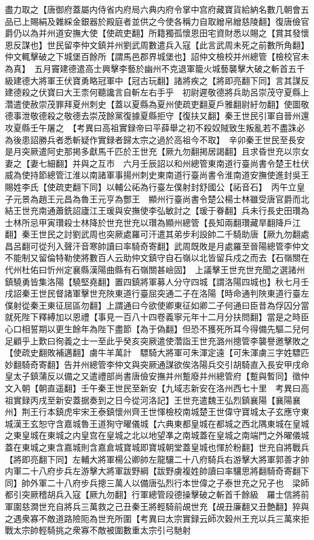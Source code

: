 盡力取之【唐御府蓋屬内侍省内府局六典内府令掌中宫府藏寶貨給納名數几朝會五品已上賜絹及雜綵金銀器於殿庭者並供之今使各稱力自取繒帛繒慈陵翻】復唐儉官爵仍以為并州道安撫大使【使疏吏翻】所籍獨孤懷恩田宅資財悉以賜之【賞其發懷恩反謀也】世民留李仲文鎮并州劉武周數遣兵入寇【此言武周未死之前數所角翻】仲文輒擊破之下城堡百餘所【謂馬邑郡界城堡也】詔仲文檢校并州總管【檢校官未為真】　五月竇建德遣高士興擊李藝於幽州不克退軍籠火城藝襲擊大破之斬首五千級建德大將軍王伏寶勇略冠軍中【冠古玩翻】諸將疾之【將即亮翻下同】言其謀反建德殺之伏寶曰大王柰何聽讒言自斬左右手乎　初尉遲敬德將兵助呂崇茂守夏縣上濳遣使赦崇茂罪拜夏州刺史【蓋以夏縣為夏州使疏吏翻夏戶雅翻尉紆勿翻】使圖敬德事泄敬德殺之敬德去崇茂餘黨復據夏縣拒守【復扶又翻】秦王世民引軍自晉州還攻夏縣壬午屠之　【考異曰高祖實録帝曰平薛舉之初不殺奴賊致生叛亂若不盡誅必為後患詔勝兵者悉斬疑作實録者歸太宗之過於高祖今不取】　辛卯秦王世民至長安　是月突厥遣阿史那掲多獻馬千匹於王世充【厥九勿翻掲居謁翻】且求昏世充以宗女妻之【妻七細翻】并與之互市　六月壬辰詔以和州總管東南道行臺尚書令楚王杜伏威為使持節總管江淮以南諸軍事揚州刺史東南道行臺尚書令淮南道安撫使進封吳王賜姓李氏【使疏吏翻下同】以輔公祏為行臺左僕射封舒國公【祏音石】　丙午立皇子元景為趙王元昌為魯王元亨為酆王　顯州行臺尚書令楚公楊士林雖受唐官爵而北結王世充南通蕭銑詔廬江王瑗與安撫使李弘敏討之【瑗于眷翻】兵未行長史田瓚為士林所忌甲寅瓚殺士林降於世充世充以瓚為顯州總管【長知兩翻瓚藏旱翻降戶江翻】秦王世民之討劉武周也突厥處羅可汗遣其弟步利設帥二千騎助唐【厥九勿翻處昌呂翻可從刋入聲汗音寒帥讀曰率騎奇寄翻】武周既敗是月處羅至晉陽總管李仲文不能制又留倫特勒使將數百人云助仲文鎮守自石嶺以北皆留兵戍之而去【石嶺關在代州杜佑曰忻州定襄縣漢陽曲縣有石嶺關甚嶮固】　上議擊王世充世充聞之選諸州鎮驍勇皆集洛陽【驍堅堯翻】置四鎮將軍募人分守四城【謂洛陽四城也】秋七月壬戌詔秦王世民督諸軍擊世充陜東道行臺屈突通二子在洛陽【時命通判陜東道行臺左僕射從秦王東征屈區勿翻】上謂通曰今欲使卿東征如卿二子何通曰臣昔為俘囚分當就死陛下釋縛加以恩禮【事見一百八十四卷義寧元年十二月分扶問翻】當是之時臣心口相誓期以更生餘年為陛下盡節【為于偽翻】但恐不獲死所耳今得備先驅二兒何足顧乎上歎曰徇義之士一至此乎癸亥突厥遣使濳詣王世充潞州摠管李襲譽邀擊敗之【使疏史翻敗補邁翻】虜牛羊萬計　驃騎大將軍可朱渾定遠【可朱渾虜三字姓驃匹妙翻騎奇寄翻】告并州總管李仲文與突厥通謀欲俟洛陽兵交引胡騎直入長安甲戌命皇太子鎮蒲反以備之又遣禮部尚書唐儉安撫并州蹔廢并州總管府【蹔與暫同】徵仲文入朝【朝直遥翻】壬午秦王世民至新安【九域志新安在洛州西七十里　考異曰高祖實録丙戌至新安蓋据奏到之日今從河洛記】王世充遣魏王弘烈鎮襄陽【襄陽襄州】荆王行本鎮虎牢宋王泰鎮懷州齊王世惲檢校南城楚王世偉守寶城太子玄應守東城漢王玄恕守含嘉城魯王道狥守曜儀城【六典東都皇城在都城之西北隅東城在皇城之東皇城在東城之内皇宫在皇城之北以地望凖之南城蓋在皇城之南端門之外曜儀城蓋在東城之東含嘉城則含嘉倉城寶城即寶城朝堂蓋皇城也惲於粉翻】世充自將戰兵【將即亮翻下同】左輔大將軍楊公卿帥左龍驤二十八府騎兵右游擊大將軍郭善才帥内軍二十八府步兵左游擊大將軍跋野綱【跋野虜複姓帥讀曰率驤思將翻騎奇寄翻下同】帥外軍二十八府步兵摠三萬人以備唐弘烈行本世偉之子泰世充之兄子也　梁師都引突厥稽胡兵入寇【厥九勿翻】行軍總管段德操擊破之斬首千餘級　羅士信將前軍圍慈澗世充自將兵三萬救之己丑秦王將輕騎前覘世充【覘丑廉翻又丑艶翻】猝與之遇衆寡不敵道路險阨為世充所圍【考異曰太宗實録云師次穀州王充以兵三萬來拒戰太宗帥輕騎挑之衆寡不敵被圍數重太宗引弓馳射